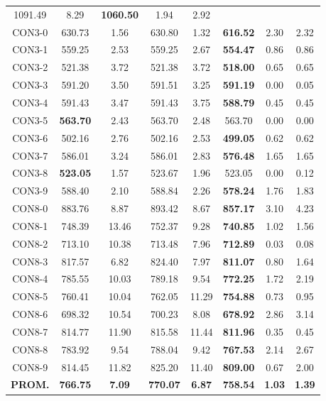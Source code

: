 \begin{table}[h]
\begin{tabular}{c c c c c c c c}
1091.49 & 8.29 & \bf{1060.50} & 
1.94 & 2.92\\CON3-0 & 630.73 & 1.56 & 
630.80 & 1.32 & \bf{616.52} & 
2.30 & 2.32\\CON3-1 & 559.25 & 2.53 & 
559.25 & 2.67 & \bf{554.47} & 
0.86 & 0.86\\CON3-2 & 521.38 & 3.72 & 
521.38 & 3.72 & \bf{518.00} & 
0.65 & 0.65\\CON3-3 & 591.20 & 3.50 & 
591.51 & 3.25 & \bf{591.19} & 
0.00 & 0.05\\CON3-4 & 591.43 & 3.47 & 
591.43 & 3.75 & \bf{588.79} & 
0.45 & 0.45\\CON3-5 & \bf{563.70} & 2.43 & 
563.70 & 2.48 & 563.70 & 0.00
 & 0.00\\
CON3-6 & 502.16 & 2.76 & 
502.16 & 2.53 & \bf{499.05} & 
0.62 & 0.62\\CON3-7 & 586.01 & 3.24 & 
586.01 & 2.83 & \bf{576.48} & 
1.65 & 1.65\\CON3-8 & \bf{523.05} & 1.57 & 
523.67 & 1.96 & 523.05 & 0.00
 & 0.12\\CON3-9 & 588.40 & 2.10 & 
588.84 & 2.26 & \bf{578.24} & 
1.76 & 1.83\\CON8-0 & 883.76 & 8.87 & 
893.42 & 8.67 & \bf{857.17} & 
3.10 & 4.23\\CON8-1 & 748.39 & 13.46 & 
752.37 & 9.28 & \bf{740.85} & 
1.02 & 1.56\\CON8-2 & 713.10 & 10.38 & 
713.48 & 7.96 & \bf{712.89} & 
0.03 & 0.08\\CON8-3 & 817.57 & 6.82 & 
824.40 & 7.97 & \bf{811.07} & 
0.80 & 1.64\\CON8-4 & 785.55 & 10.03 & 
789.18 & 9.54 & \bf{772.25} & 
1.72 & 2.19\\CON8-5 & 760.41 & 10.04 & 
762.05 & 11.29 & \bf{754.88} & 
0.73 & 0.95\\CON8-6 & 698.32 & 10.54 & 
700.23 & 8.08 & \bf{678.92} & 
2.86 & 3.14\\CON8-7 & 814.77 & 11.90 & 
815.58 & 11.44 & \bf{811.96} & 
0.35 & 0.45\\CON8-8 & 783.92 & 9.54 & 
788.04 & 9.42 & \bf{767.53} & 
2.14 & 2.67\\CON8-9 & 814.45 & 11.82 & 
825.20 & 11.40 & \bf{809.00} & 
0.67 & 2.00\\\bf{PROM.} & 
\bf{766.75} & \bf{7.09} & \bf{770.07} & \bf{6.87} & \bf{758.54} & \bf{1.03} & \bf{1.39}\\[1ex]\hline
\end{tabular}
\label{table:SS-M-150-1.0}
\end{table}

